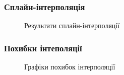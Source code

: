 \documentclass[a4paper,14pt]{extarticle} %
\begin{document}
\newpage
\subsubsection*{Сплайн-інтерполяція}



\begin{figure}[H]
    \caption{Результати сплайн-інтерполяції}
    \label{fig:Spline}
\end{figure}

\subsubsection*{Похибки інтеполяції}



\begin{figure}[H]
    \caption{Графіки похибок інтерполяції}
    \label{fig:Errors}
\end{figure}
\end{document}
